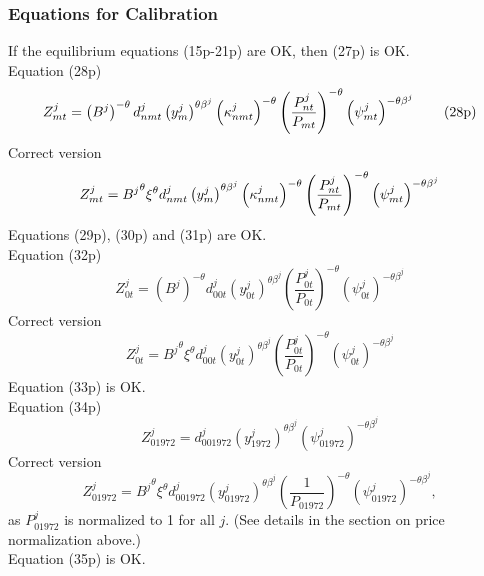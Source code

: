 \documentclass[11pt,oneside,a4paper]{article}
\begin{document}
\subsubsection{Equations for Calibration}
If the equilibrium equations (15p-21p) are OK, then (27p) is OK.\\
Equation (28p)
\begin{equation}
Z_{mt}^{j}=\left( B^{j}\right) ^{-\theta }d_{nmt}^{j}\left( y_{m}^{j}\right)
^{\theta \beta ^{j}}\left( \kappa _{nmt}^{j}\right) ^{-\theta }\left( \frac{%
P_{nt}^{j}}{P_{mt}}\right) ^{-\theta }\left( \psi _{mt}^{j}\right) ^{-\theta
\beta ^{j}}  \tag{28p}
\end{equation}%
Correct version
\begin{equation}
Z_{mt}^{j}={B^{j}}^{\theta } {\xi}^\theta d_{nmt}^{j}\left( y_{m}^{j}\right)
^{\theta \beta ^{j}}\left( \kappa _{nmt}^{j}\right) ^{-\theta }\left( \frac{%
P_{nt}^{j}}{P_{mt}}\right) ^{-\theta }\left( \psi _{mt}^{j}\right) ^{-\theta
\beta ^{j}}
\end{equation}%
Equations (29p), (30p) and (31p) are OK.\\
Equation (32p)
\begin{equation}
Z_{0t}^{j}=\left( B^{j}\right) ^{-\theta }d_{00t}^{j}\left(
y_{0t}^{j}\right) ^{\theta \beta ^{j}}\left( \frac{P_{0t}^{j}}{P_{0t}}%
\right) ^{-\theta }\left( \psi _{0t}^{j}\right) ^{-\theta \beta ^{j}} \tag{32p}
\end{equation}%
Correct version
\begin{equation}
Z_{0t}^{j}={B^{j}}^{\theta } {\xi}^\theta d_{00t}^{j}\left(
y_{0t}^{j}\right) ^{\theta \beta ^{j}}\left(\frac{P_{0t}^{j}}{P_{0t}}\right) ^{-\theta }\left( \psi _{0t}^{j}\right) ^{-\theta \beta ^{j}}
\end{equation}%
Equation (33p) is OK.\\
Equation (34p)
\begin{equation}
Z_{01972}^{j}=d_{001972}^{j}\left( y_{1972}^{j}\right) ^{\theta \beta
^{j}}\left( \psi _{01972}^{j}\right) ^{-\theta \beta ^{j}} \tag{34p}
\end{equation}%
Correct version
\begin{equation}
Z_{01972}^{j}= {B^{j}}^{\theta } {\xi}^\theta d_{001972}^{j}\left( y_{01972}^{j}\right) ^{\theta \beta
^{j}}\left(\frac{1}{P_{01972}}\right) ^{-\theta}\left(\psi_{01972}^{j}\right) ^{-\theta \beta ^{j}}, 
\end{equation}
as $P_{01972}^{j}$ is normalized to 1 for all $j$. (See details in the section on price normalization above.)\\
Equation (35p) is OK.
\end{document}
